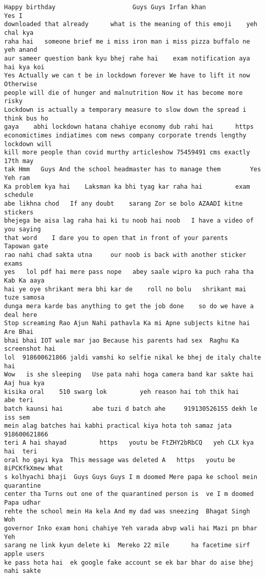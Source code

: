 \documentclass[11pt]{article}
\begin{document}
\begin{tcolorbox}[breakable, size=fbox, boxrule=.5pt, pad at break*=1mm, opacityfill=0]
\begin{Verbatim}[commandchars=\\\{\}]
Happy birthday                     Guys Guys Irfan khan              Yes I
downloaded that already      what is the meaning of this emoji    yeh chal kya
raha hai   someone brief me i miss iron man i miss pizza buffalo ne yeh anand
aur sameer question bank kyu bhej rahe hai    exam notification aya hai kya koi
Yes Actually we can t be in lockdown forever We have to lift it now Otherwise
people will die of hunger and malnutrition Now it has become more risky
Lockdown is actually a temporary measure to slow down the spread i think bus ho
gaya    abhi lockdown hatana chahiye economy dub rahi hai      https
economictimes indiatimes com news company corporate trends lengthy lockdown will
kill more people than covid murthy articleshow 75459491 cms exactly     17th may
tak Hmm   Guys And the school headmaster has to manage them        Yes Yeh ram
Ka problem kya hai    Laksman ka bhi tyag kar raha hai         exam schedule
abe likhna chod   If any doubt    sarang Zor se bolo AZAADI kitne stickers
bhejega be aisa lag raha hai ki tu noob hai noob   I have a video of you saying
that word    I dare you to open that in front of your parents    Tapowan gate
rao nahi chad sakta utna     our noob is back with another sticker       exams
yes   lol pdf hai mere pass nope   abey saale wipro ka puch raha tha Kab Ka aaya
hai ye oye shrikant mera bhi kar de    roll no bolu   shrikant mai tuze samosa
dunga mera karde bas anything to get the job done    so do we have a deal here
Stop screaming Rao Ajun Nahi pathavla Ka mi Apne subjects kitne hai  Are Bhai
bhai bhai IOT wale mar jao Because his parents had sex  Raghu Ka screenshot hai
lol  918600621866 jaldi vamshi ko selfie nikal ke bhej de italy chalte hai
Wow   is she sleeping   Use pata nahi hoga camera band kar sakte hai Aaj hua kya
kisika oral    510 swarg lok         yeh reason hai toh thik hai    abe teri
batch kaunsi hai        abe tuzi d batch ahe     919130526155 dekh le iss sem
mein alag batches hai kabhi practical kiya hota toh samaz jata  918600621866
teri A hai shayad         https   youtu be FtZHY2bRbCQ   yeh CLX kya hai  teri
oral ho gayi kya  This message was deleted A   https   youtu be 8iPCKfkXmew What
s kolhyachi bhaji  Guys Guys Guys I m doomed Mere papa ke school mein quarantine
center tha Turns out one of the quarantined person is  ve I m doomed Papa udhar
rehte the school mein Ha kela And my dad was sneezing  Bhagat Singh  Woh
governor Inko exam honi chahiye Yeh varada abvp wali hai Mazi pn bhar    Yeh
sarang ne link kyun delete ki  Mereko 22 mile      ha facetime sirf apple users
ke pass hota hai  ek google fake account se ek bar bhar do aise bhej nahi sakte

\end{Verbatim}
\end{tcolorbox}
\end{document}
